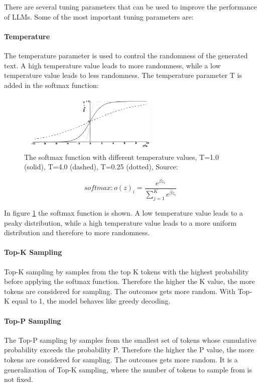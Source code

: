There are several tuning parameters that can be used to improve the performance of LLMs. Some of the most important tuning parameters are:

\paragraph{Temperature}
The temperature parameter is used to control the randomness of the generated text. A high temperature value leads to more randomness, while a low temperature value leads to less randomness. The temperature parameter T is added in the softmax function:

\begin{figure}[h!]
    \centering
    \includegraphics[width=0.6\textwidth]{images/temperature.png}
    \caption{The softmax function with different temperature values, T=1.0 (solid), T=4.0 (dashed), T=0.25 (dotted), Source: \cite{ACKLEY.1985}}
    \label{fig:temperature}
\end{figure}

$$softmax: o(z)_i = \frac{e^{\beta z_i}}{\sum_{j=1}^K e^{\beta z_i}}$$

In figure \ref{fig:temperature} the softmax function is shown. A low temperature value leads to a peaky distribution, while a high temperature value leads to a more uniform distribution and therefore to more randomness.


\paragraph{Top-K Sampling}
Top-K sampling by \cite{Fan.13.05.2018} samples from the top K tokens with the highest probability before applying the softmax function. Therefore the higher the K value, the more tokens are considered for sampling. The outcomes gets more random. With Top-K equal to 1, the model behaves like greedy decoding.

\paragraph{Top-P Sampling}
The Top-P sampling by \cite{Holtzman.22.04.2019} samples from the smallest set of tokens whose cumulative probability exceeds the probability P. Therefore the higher the P value, the more tokens are considered for sampling. The outcomes gets more random. It is a generalization of Top-K sampling, where the number of tokens to sample from is not fixed.